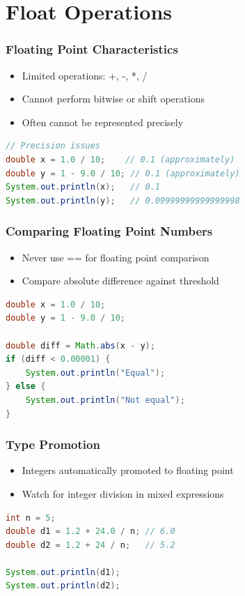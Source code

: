 \documentclass[serif, aspectratio=169]{beamer}
\begin{document}
\section{Float Operations}
\begin{frame}[fragile]
\frametitle{Floating Point Characteristics}
\begin{itemize}
    \item Limited operations: +, -, *, /
    \item Cannot perform bitwise or shift operations
    \item Often cannot be represented precisely
\end{itemize}
\begin{lstlisting}[language=Java]
// Precision issues
double x = 1.0 / 10;    // 0.1 (approximately)
double y = 1 - 9.0 / 10; // 0.1 (approximately)
System.out.println(x);   // 0.1
System.out.println(y);   // 0.09999999999999998
\end{lstlisting}
\end{frame}

\begin{frame}[fragile]
\frametitle{Comparing Floating Point Numbers}
\begin{itemize}
    \item Never use == for floating point comparison
    \item Compare absolute difference against threshold
\end{itemize}
\begin{lstlisting}[language=Java]
double x = 1.0 / 10;
double y = 1 - 9.0 / 10;

double diff = Math.abs(x - y);
if (diff < 0.00001) {
    System.out.println("Equal");
} else {
    System.out.println("Not equal");
}
\end{lstlisting}
\end{frame}

\begin{frame}[fragile]
\frametitle{Type Promotion}
\begin{itemize}
    \item Integers automatically promoted to floating point
    \item Watch for integer division in mixed expressions
\end{itemize}
\begin{lstlisting}[language=Java]
int n = 5;
double d1 = 1.2 + 24.0 / n; // 6.0
double d2 = 1.2 + 24 / n;   // 5.2

System.out.println(d1);
System.out.println(d2);
\end{lstlisting}
\end{frame}
\end{document}
